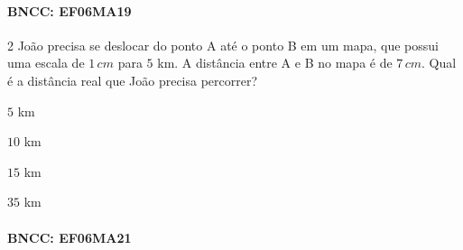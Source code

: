 \paragraph{BNCC: EF06MA19 }


\num{2}  João precisa se deslocar do ponto A até o ponto B em um mapa, que
possui uma escala de $1\,cm$ para $5$ km. A distância entre A e B no mapa é
de $7\,cm$. Qual é a distância real que João precisa percorrer?

\begin{escolha}
\item $5$ km
\item $10$ km
\item $15$ km
\item $35$ km
\end{escolha}

\paragraph{BNCC: EF06MA21 }


